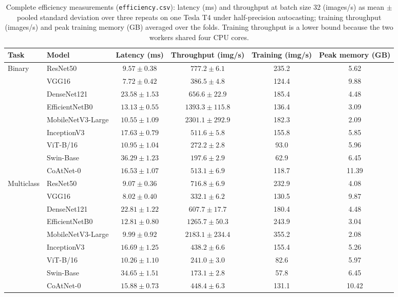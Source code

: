 \documentclass[11pt]{article}
\begin{document}
\begin{table}[htbp]
\centering
\caption{Complete efficiency measurements (\texttt{efficiency.csv}): latency (ms) and throughput at batch size 32 (images/s) as mean $\pm$ pooled standard deviation over three repeats on one Tesla T4 under half-precision autocasting; training throughput (images/s) and peak training memory (GB) averaged over the folds. Training throughput is a lower bound because the two workers shared four CPU cores.}
\scriptsize
\begin{tabular*}{\textwidth}{@{\extracolsep{\fill}}llcccc@{}}
\toprule
Task & Model & Latency (ms) & Throughput (img/s) & Training (img/s) & Peak memory (GB) \\
\midrule
\multirow{9}{*}{Binary} & ResNet50 & $9.57\pm 0.38$ & $777.2\pm 6.1$ & 235.2 & 5.62 \\
 & VGG16 & $7.72\pm 0.42$ & $386.5\pm 4.8$ & 124.4 & 9.88 \\
 & DenseNet121 & $23.58\pm 1.53$ & $656.6\pm 22.9$ & 185.4 & 4.48 \\
 & EfficientNetB0 & $13.13\pm 0.55$ & $1393.3\pm 115.8$ & 136.4 & 3.09 \\
 & MobileNetV3-Large & $10.55\pm 1.09$ & $2301.1\pm 292.9$ & 182.3 & 2.09 \\
 & InceptionV3 & $17.63\pm 0.79$ & $511.6\pm 5.8$ & 155.8 & 5.85 \\
 & ViT-B/16 & $10.95\pm 1.04$ & $272.2\pm 2.8$ & 93.0 & 5.96 \\
 & Swin-Base & $36.29\pm 1.23$ & $197.6\pm 2.9$ & 62.9 & 6.45 \\
 & CoAtNet-0 & $16.53\pm 1.07$ & $513.1\pm 6.9$ & 118.7 & 11.39 \\
\midrule
\multirow{9}{*}{Multiclass} & ResNet50 & $9.07\pm 0.36$ & $716.8\pm 6.9$ & 232.9 & 4.08 \\
 & VGG16 & $8.02\pm 0.40$ & $332.1\pm 6.2$ & 130.5 & 9.87 \\
 & DenseNet121 & $22.81\pm 1.22$ & $607.7\pm 17.7$ & 180.4 & 4.48 \\
 & EfficientNetB0 & $12.81\pm 0.80$ & $1265.7\pm 50.3$ & 243.9 & 3.04 \\
 & MobileNetV3-Large & $9.99\pm 0.92$ & $2183.1\pm 234.4$ & 355.2 & 2.08 \\
 & InceptionV3 & $16.69\pm 1.25$ & $438.2\pm 6.6$ & 155.4 & 5.26 \\
 & ViT-B/16 & $10.26\pm 1.10$ & $241.0\pm 3.0$ & 82.6 & 5.97 \\
 & Swin-Base & $34.65\pm 1.51$ & $173.1\pm 2.8$ & 57.8 & 6.45 \\
 & CoAtNet-0 & $15.88\pm 0.73$ & $448.4\pm 6.3$ & 131.1 & 10.42 \\
\bottomrule
\end{tabular*}
\end{table}
\end{document}
